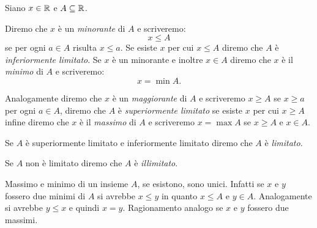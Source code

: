 \begin{definition}
  \mymark{***}%
  \label{def:minorante}%
  \label{def:maggiorante}%
  \label{def:minimo}%
  \label{def:limitato}%
  Siano $x\in {\mathbb R}$ e $A\subseteq {\mathbb R}$.

  Diremo che $x$ è un \emph{minorante}%
%
 di $A$ e scriveremo:
  \[
    x \le A
  \]
  se per ogni $a\in A$ risulta $x\le a$. 
  Se esiste $x$ per cui $x\le A$ diremo che $A$ 
  è \emph{inferiormente limitato}.
  Se $x$ è un minorante e inoltre $x\in A$ diremo 
  che $x$ è il \emph{minimo}%
%
 di $A$ e scriveremo:
  \[
    x = \min A.  
  \] 

  Analogamente diremo che $x$ è un \emph{maggiorante}%
%
  di $A$ e scriveremo $x \ge A$ se $x\ge a$ per ogni $a\in A$,
  diremo che $A$ è \emph{superiormente limitato} 
  se esiste $x$ per cui $x \ge A$ infine
  diremo che $x$ è il \emph{massimo}%
%
 di $A$ 
  e scriveremo $x=\max A$ se $x\ge A$ e $x\in A$.

  Se $A$ è superiormente limitato e inferiormente limitato
  diremo che $A$ è \emph{limitato}.
  
  Se $A$ non è limitato diremo che $A$ è \emph{illimitato}.
\end{definition}

Massimo e minimo di un insieme $A$, se esistono, sono unici.
Infatti se $x$ e $y$ fossero due minimi di $A$ si avrebbe $x\le y$ in
quanto $x\le A$ e $y\in A$. Analogamente si avrebbe $y\le x$ e
quindi $x=y$. Ragionamento analogo se $x$ e $y$ fossero due massimi.


